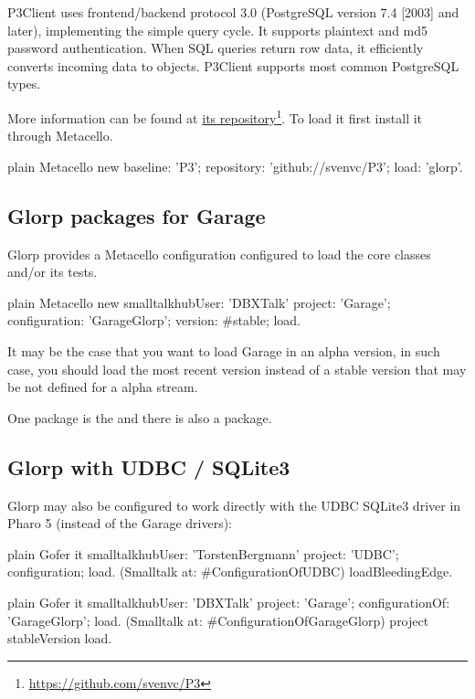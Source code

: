 \documentclass[10pt,twoside,english]{_support/latex/sbabook/sbabook}
\begin{document}
P3Client uses frontend/backend protocol 3.0 (PostgreSQL version 7.4 {[}2003{]} and later), implementing the simple query cycle. It supports plaintext and md5 password authentication. When SQL queries return row data, it efficiently converts incoming data to objects. P3Client supports most common PostgreSQL types.

More information can be found at \href{https://github.com/svenvc/P3}{its repository}\footnote{\url{https://github.com/svenvc/P3}}.
To load it first install it through Metacello.

\begin{displaycode}{plain}
Metacello new
   baseline: 'P3';
   repository: 'github://svenvc/P3';
   load: 'glorp'.
\end{displaycode}
\subsection{Glorp packages for Garage}
Glorp provides a Metacello configuration configured to load the core classes
and/or its tests.

\begin{displaycode}{plain}
Metacello new
	smalltalkhubUser: 'DBXTalk' project: 'Garage';
	configuration: 'GarageGlorp';
	version: #stable;
	load.
\end{displaycode}

It may be the case that you want to load Garage in an alpha version, in such case, you should load the most recent version instead of a stable version 
that may be not defined for a alpha stream.

One package is the  and there is also a  package.
\subsection{Glorp with UDBC / SQLite3}
Glorp may also be configured to work directly with the UDBC SQLite3
driver in Pharo 5 (instead of the Garage drivers):

\begin{displaycode}{plain}
Gofer it	 
	smalltalkhubUser: 'TorstenBergmann' project: 'UDBC';
	configuration; 
	load.
	(Smalltalk at: #ConfigurationOfUDBC) loadBleedingEdge.
\end{displaycode}

\begin{displaycode}{plain}
Gofer it 
	smalltalkhubUser: 'DBXTalk' project: 'Garage';
	configurationOf: 'GarageGlorp';
	load. 
	(Smalltalk at: #ConfigurationOfGarageGlorp) project stableVersion load.
\end{displaycode}
\end{document}
